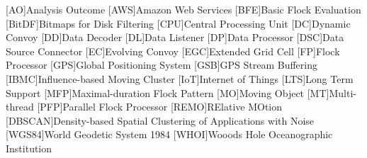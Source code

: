 \begin{acronym}[ACRONYM]
[AO]{Analysis Outcome}
[AWS]{Amazon Web Services}
[BFE]{Basic Flock Evaluation}
[BitDF]{Bitmaps for Disk Filtering}
[CPU]{Central Processing Unit}
[DC]{Dynamic Convoy}
[DD]{Data Decoder}
[DL]{Data Listener}
[DP]{Data Processor}
[DSC]{Data Source Connector}
[EC]{Evolving Convoy}
[EGC]{Extended Grid Cell}
[FP]{Flock Processor}
[GPS]{Global Positioning System}
[GSB]{GPS Stream Buffering}
[IBMC]{Influence-based Moving Cluster}
[IoT]{Internet of Things}
[LTS]{Long Term Support}
[MFP]{Maximal-duration Flock Pattern}
[MO]{Moving Object}
[MT]{Multi-thread}
[PFP]{Parallel Flock Processor}
[REMO]{RElative MOtion}
[DBSCAN]{Density-based Spatial Clustering of Applications with Noise}
[WGS84]{World Geodetic System 1984}
[WHOI]{Wooods Hole Oceanographic Institution}
\end{acronym}
